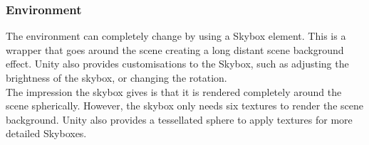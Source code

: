 \documentclass[12pt]{article} %
\begin{document}
\begin{flushleft}
\subsubsection{Environment} %
The environment can completely change by using a Skybox element. This is a wrapper that goes around the scene creating a long distant scene background effect. Unity also provides customisations to the Skybox, such as adjusting the brightness of the skybox, or changing the rotation.\\
The impression the skybox gives is that it is rendered completely around the scene spherically. However, the skybox only needs six textures to render the scene background. Unity also provides a tessellated sphere to apply textures for more detailed Skyboxes. \\

\end{flushleft}
\end{document}
